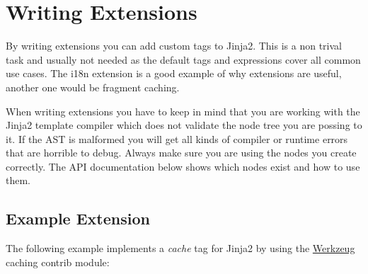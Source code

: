 \documentclass[a4paper,10pt,english]{sphinxmanual}
\begin{document}
\section{Writing Extensions}
\label{extensions:writing-extensions}\label{extensions:id4}\label{extensions:module-jinja2.ext}
By writing extensions you can add custom tags to Jinja2.  This is a non trival
task and usually not needed as the default tags and expressions cover all
common use cases.  The i18n extension is a good example of why extensions are
useful, another one would be fragment caching.

When writing extensions you have to keep in mind that you are working with the
Jinja2 template compiler which does not validate the node tree you are possing
to it.  If the AST is malformed you will get all kinds of compiler or runtime
errors that are horrible to debug.  Always make sure you are using the nodes
you create correctly.  The API documentation below shows which nodes exist and
how to use them.


\subsection{Example Extension}
\label{extensions:example-extension}
The following example implements a \emph{cache} tag for Jinja2 by using the
\href{http://werkzeug.pocoo.org/}{Werkzeug} caching contrib module:
\end{document}
